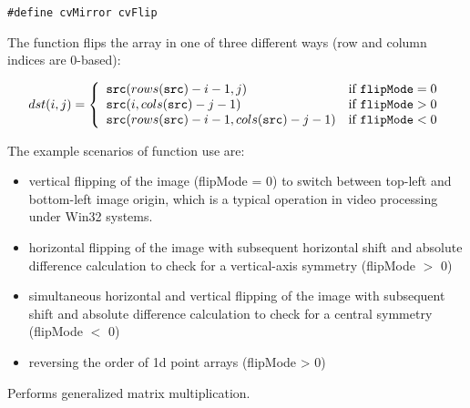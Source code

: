 
\begin{lstlisting}
#define cvMirror cvFlip
\end{lstlisting}

\begin{description}
\end{description}

The function flips the array in one of three different ways (row and column indices are 0-based):

\[
dst(i,j) = \left\{ \begin{array}{l l} \texttt{src}(rows(\texttt{src})-i-1,j) & \mbox{if $\texttt{flipMode} = 0$}\\ \texttt{src}(i,cols(\texttt{src})-j-1) & \mbox{if $\texttt{flipMode} > 0$}\\ \texttt{src}(rows(\texttt{src})-i-1,cols(\texttt{src})-j-1) & \mbox{if $\texttt{flipMode} < 0$}\\ \end{array} \right.
\]

The example scenarios of function use are:
\begin{itemize}
  \item vertical flipping of the image (flipMode = 0) to switch between top-left and bottom-left image origin, which is a typical operation in video processing under Win32 systems.
  \item horizontal flipping of the image with subsequent horizontal shift and absolute difference calculation to check for a vertical-axis symmetry (flipMode $>$ 0)
  \item simultaneous horizontal and vertical flipping of the image with subsequent shift and absolute difference calculation to check for a central symmetry (flipMode $<$ 0)
  \item reversing the order of 1d point arrays (flipMode > 0)
\end{itemize}

Performs generalized matrix multiplication.

              
